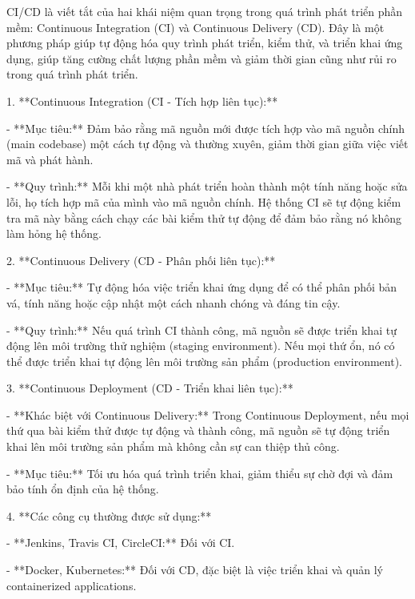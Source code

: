 





CI/CD là viết tắt của hai khái niệm quan trọng trong quá trình phát triển phần mềm: Continuous Integration (CI) và Continuous Delivery (CD). Đây là một phương pháp giúp tự động hóa quy trình phát triển, kiểm thử, và triển khai ứng dụng, giúp tăng cường chất lượng phần mềm và giảm thời gian cũng như rủi ro trong quá trình phát triển.

1. **Continuous Integration (CI - Tích hợp liên tục):**

- **Mục tiêu:** Đảm bảo rằng mã nguồn mới được tích hợp vào mã nguồn chính (main codebase) một cách tự động và thường xuyên, giảm thời gian giữa việc viết mã và phát hành.

- **Quy trình:** Mỗi khi một nhà phát triển hoàn thành một tính năng hoặc sửa lỗi, họ tích hợp mã của mình vào mã nguồn chính. Hệ thống CI sẽ tự động kiểm tra mã này bằng cách chạy các bài kiểm thử tự động để đảm bảo rằng nó không làm hỏng hệ thống.

2. **Continuous Delivery (CD - Phân phối liên tục):**

- **Mục tiêu:** Tự động hóa việc triển khai ứng dụng để có thể phân phối bản vá, tính năng hoặc cập nhật một cách nhanh chóng và đáng tin cậy.

- **Quy trình:** Nếu quá trình CI thành công, mã nguồn sẽ được triển khai tự động lên môi trường thử nghiệm (staging environment). Nếu mọi thứ ổn, nó có thể được triển khai tự động lên môi trường sản phẩm (production environment).

3. **Continuous Deployment (CD - Triển khai liên tục):**

- **Khác biệt với Continuous Delivery:** Trong Continuous Deployment, nếu mọi thứ qua bài kiểm thử được tự động và thành công, mã nguồn sẽ tự động triển khai lên môi trường sản phẩm mà không cần sự can thiệp thủ công.

- **Mục tiêu:** Tối ưu hóa quá trình triển khai, giảm thiểu sự chờ đợi và đảm bảo tính ổn định của hệ thống.

4. **Các công cụ thường được sử dụng:**

- **Jenkins, Travis CI, CircleCI:** Đối với CI.

- **Docker, Kubernetes:** Đối với CD, đặc biệt là việc triển khai và quản lý containerized applications.

